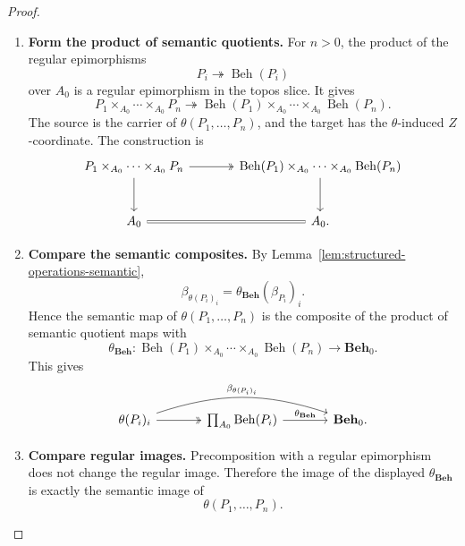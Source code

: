 \begin{proof}
    \leavevmode
    \begin{enumerate}
        \item \textbf{Form the product of semantic quotients.}
        For \(n>0\), the product of the regular epimorphisms
        \[
            P_i\twoheadrightarrow\operatorname{Beh}(P_i)
        \]
        over \(A_0\) is a regular epimorphism in the topos slice. It gives
        \[
            P_1\times_{A_0}\cdots\times_{A_0}P_n
            \twoheadrightarrow
            \operatorname{Beh}(P_1)\times_{A_0}\cdots\times_{A_0}
            \operatorname{Beh}(P_n).
        \]
        The source is the carrier of \(\theta(P_1,\dots,P_n)\), and the target
        has the \(\theta\)-induced \(Z\)-coordinate. The construction is
        \[
        \begin{tikzcd}[column sep=large, row sep=large]
            P_1\times_{A_0}\cdots\times_{A_0}P_n
                \arrow[r, two heads]
                \arrow[d]
            &
            \operatorname{Beh}(P_1)\times_{A_0}\cdots\times_{A_0}
            \operatorname{Beh}(P_n)
                \arrow[d]
            \\
            A_0
                \arrow[r, equal]
            &
            A_0 .
        \end{tikzcd}
        \]

        \item \textbf{Compare the semantic composites.}
        By Lemma~\ref{lem:structured-operations-semantic},
        \[
            \beta_{\theta(P_i)_i}
            =
            \theta_{\mathbf{Beh}}(\beta_{P_i})_i.
        \]
        Hence the semantic map of \(\theta(P_1,\dots,P_n)\) is the composite of
        the product of semantic quotient maps with
        \[
            \theta_{\mathbf{Beh}}:
            \operatorname{Beh}(P_1)\times_{A_0}\cdots\times_{A_0}
            \operatorname{Beh}(P_n)
            \to
            \mathbf{Beh}_0.
        \]
        This gives
        \[
        \begin{tikzcd}[column sep=large, row sep=large]
            \theta(P_i)_i
                \arrow[r, two heads]
                \arrow[rr, bend left=18, "\beta_{\theta(P_i)_i}"]
            &
            \prod_{A_0}\operatorname{Beh}(P_i)
                \arrow[r, "\theta_{\mathbf{Beh}}"]
            &
            \mathbf{Beh}_0 .
        \end{tikzcd}
        \]

        \item \textbf{Compare regular images.}
        Precomposition with a regular epimorphism does not change the regular
        image. Therefore the image of the displayed \(\theta_{\mathbf{Beh}}\)
        is exactly the semantic image of
        \[
            \theta(P_1,\dots,P_n).
        \]


\end{enumerate}
\end{proof}
